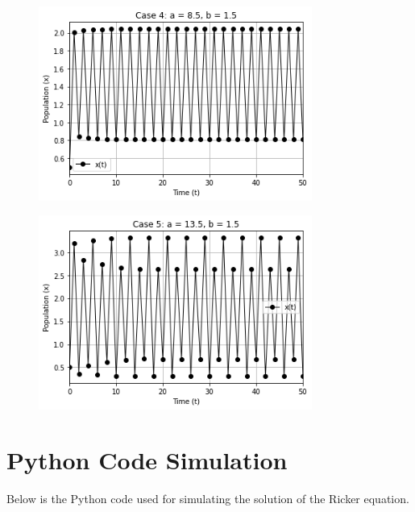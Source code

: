\documentclass [a4paper]{article}
\begin{document}
\newpage
\begin{figure}[h]
    \centering 
    \includegraphics[width=0.80\textwidth]{Fig 4.png} 
\end{figure}
\begin{figure}[h] 
    \centering 
    \includegraphics[width=0.80\textwidth]{Fig 5.png} 
\end{figure}
\newpage
\section{Python Code Simulation}

Below is the Python code used for simulating the solution of the Ricker equation.
\end{document}
